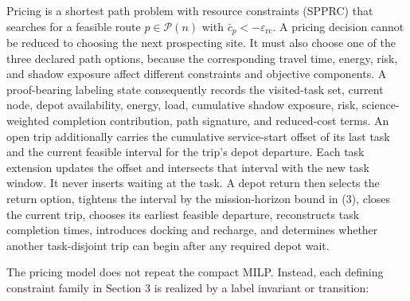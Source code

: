 \documentclass[
  11pt,
]{article}
\begin{document}
Pricing is a shortest path problem with resource constraints (SPPRC)
that searches for a feasible route \(p\in\mathcal{P}(n)\) with
\(\bar c_p<-\varepsilon_{\mathrm{rc}}\). A pricing decision cannot be
reduced to choosing the next prospecting site. It must also choose one
of the three declared path options, because the corresponding travel
time, energy, risk, and shadow exposure affect different constraints and
objective components. A proof-bearing labeling state consequently
records the visited-task set, current node, depot availability, energy,
load, cumulative shadow exposure, risk, science-weighted completion
contribution, path signature, and reduced-cost terms. An open trip
additionally carries the cumulative service-start offset of its last
task and the current feasible interval for the trip's depot departure.
Each task extension updates the offset and intersects that interval with
the new task window. It never inserts waiting at the task. A depot
return then selects the return option, tightens the interval by the
mission-horizon bound in (3), closes the current trip, chooses its
earliest feasible departure, reconstructs task completion times,
introduces docking and recharge, and determines whether another
task-disjoint trip can begin after any required depot wait.

The pricing model does not repeat the compact MILP. Instead, each
defining constraint family in Section 3 is realized by a label invariant
or transition:
\end{document}
